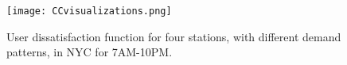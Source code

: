 
\begin{figure}
\centering
\texttt{[image: CCvisualizations.png]}
\caption{User dissatisfaction function for four stations, with different demand patterns, in NYC for 7AM-10PM.}
\label{fig:cost_curves}
\end{figure}

\vspace{-.5in}
